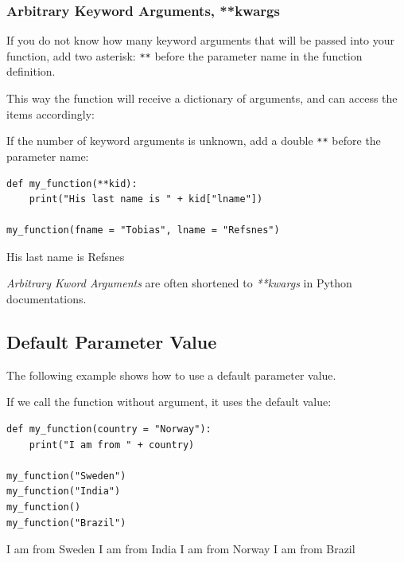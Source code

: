 \documentclass[12pt,a4paper]{article}
\newcommand{\code}[1]{%
	\colorbox{backcolour}{\lstinline{#1}}%
}
\newcommand{\lcode}[1]{%
	\lstinline{#1}%
}
\begin{document}
\subsubsection{Arbitrary Keyword Arguments, **kwargs}

If you do not know how many keyword arguments that will be passed into your
function, add two asterisk: \code{**} before the parameter name in the function
definition.

This way the function will receive a dictionary of arguments, and can access
the items accordingly:

\begin{ebox}
If the number of keyword arguments is unknown, add a double \lcode{**} before the parameter name:
	\begin{lstlisting}
def my_function(**kid):
    print("His last name is " + kid["lname"])

my_function(fname = "Tobias", lname = "Refsnes")
	\end{lstlisting}
\tcblower
	\begin{vercode}
His last name is Refsnes
	\end{vercode}
\end{ebox}

\begin{nbox}
\textit{Arbitrary Kword Arguments} are often shortened to \textit{**kwargs}
in Python documentations.
\end{nbox}
\subsection{Default Parameter Value}

The following example shows how to use a default parameter value.

If we call the function without argument, it uses the default value:

\begin{ebox}
	\begin{lstlisting}
def my_function(country = "Norway"):
    print("I am from " + country)

my_function("Sweden")
my_function("India")
my_function()
my_function("Brazil")
	\end{lstlisting}
\tcblower
	\begin{vercode}
I am from Sweden
I am from India
I am from Norway
I am from Brazil
	\end{vercode}
\end{ebox}
\end{document}
